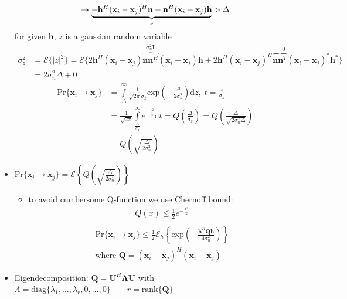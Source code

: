 \documentclass[a4paper, 10pt]{article}
\begin{document}
\begin{itemize}
\begin{align*}
	\end{align*}
	\begin{align*}
		\rightarrow \underbrace{\mathbf{-h^{\mathnormal{H}}(x_{\mathnormal{i}}-x_{\mathnormal{j}})^{\mathnormal{H}}n-n^{\mathnormal{H}}(x_{\mathnormal{i}}-x_{\mathnormal{j}})h}}_{z}>\Delta
	\end{align*}
for given $\mathbf{h}$, $z$ is a gaussian random variable
\begin{align*}
	\sigma_z^2&=\mathcal{E}\{|z|^2\}=\mathcal{E}\{2\mathbf{h}^H(\mathbf{x}_i-\mathbf{x}_j)\overbrace{\mathbf{nn}^H}^{\sigma_n^2\mathbf{I}}(\mathbf{x}_i-\mathbf{x}_j)\mathbf{h}
	+2\mathbf{h}^H(\mathbf{x}_i-\mathbf{x}_j)^H\overbrace{\mathbf{nn}^T}^{=0}(\mathbf{x}_i-\mathbf{x}_j)^*\mathbf{h}^*\}\\
		&=2\sigma_n^2\Delta+0
\end{align*}
\begin{align*}
	\mathrm{Pr}\{\mathbf{x}_i\rightarrow\mathbf{x}_j\}&=\int\limits_{\Delta}^{\infty}\frac{1}{\sqrt{2\pi}\sigma_z}\mathrm{exp}\left(-\frac{z^2}{2\sigma_z^2}\right)\mathrm{d}z, \; t=\frac{z}{\sigma_z}\\
	&=\frac{1}{\sqrt{2\pi}}\int\limits_{\frac{\Delta}{\sigma_z}}^{\infty}e^{-\frac{t^2}{2}}\mathrm{d}t=Q\left(\frac{\Delta}{\sigma_z}\right)=Q\left(\frac{\Delta}{\sqrt{2\sigma_n^2\Delta}}\right)\\
	&=Q\left(\sqrt{\frac{\Delta}{2\sigma_n^2}}\right)
\end{align*}
	\item $\mathrm{Pr}\{\mathbf{x}_i\rightarrow\mathbf{x}_j\}=\mathcal{E}\left\{Q\left(\sqrt{\frac{\Delta}{2\sigma_n^2}}\right)\right\}$
	\begin{itemize}
	\item to avoid cumbersome Q-function we use Chernoff bound:
	\begin{align*}	
		\boxed{Q(x)\leq\frac{1}{2}e^{-\frac{x^2}{2}}}\\
	\end{align*}
	\begin{align*}
		\mathrm{Pr}\{\mathbf{x}_i\rightarrow\mathbf{x}_j\}\leq \frac{1}{2}\mathcal{E}_h\left\{\mathrm{exp}\left(-\frac{\mathbf{h}^H\mathbf{Qh}}{4\sigma_n^2}\right)\right\}\\
		\text{where } \mathbf{Q}=(\mathbf{x}_i-\mathbf{x}_j)^H(\mathbf{x}_i-\mathbf{x}_j)
	\end{align*}
	\end{itemize}
	\item Eigendecomposition: $\mathbf{Q=U}^H\mathbf{\Lambda U}$ with $\Lambda = \mathrm{diag}\{\lambda_1,\dots,\lambda_r, 0,\dots,0\}\qquad r=\mathrm{rank}\{\mathbf{Q}\}$\\


\end{itemize}
\end{document}
